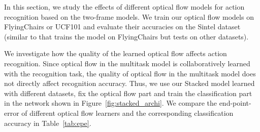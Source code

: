 \documentclass[10pt,twocolumn,letterpaper]{article}
\begin{document}
In this section, we study the effects of different optical flow models for action recognition based on the two-frame models. We train our optical flow models on FlyingChairs or UCF101 and evaluate their accuracies on the Sintel dataset (similar to \cite{FischerDIHHGSCB15} that trains the model on FlyingChairs but tests on other datasets).

We investigate how the quality of the learned optical flow affects action recognition.
Since optical flow in the multitask model is collaboratively learned with the recognition task, the quality of optical flow in the multitask model does not directly affect recognition accuracy.
Thus, we use our Stacked model learned with different datasets, fix the optical flow part and train the classification part in the network shown in Figure~\ref{fig:stacked_archi}.
We compare the end-point-error of different optical flow learners and the corresponding classification accuracy in Table~\ref{tab:epe}.
\end{document}
